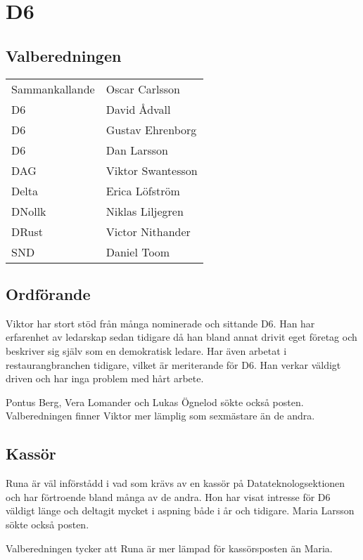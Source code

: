\section{D6}

\subsection{Valberedningen}
\begin{autoframe}

\begin{tabular}{ll}
Sammankallande & Oscar Carlsson \\
D6 & David Ådvall \\
D6 & Gustav Ehrenborg \\
D6 & Dan Larsson \\
DAG  & Viktor Swantesson \\
Delta  & Erica Löfström \\
DNollk & Niklas Liljegren \\
DRust & Victor Nithander \\
SND  & Daniel Toom
\end{tabular}

\end{autoframe}



\subsection{Ordförande}
\begin{autoframe}
Viktor har stort stöd från många nominerade och sittande D6. Han har erfarenhet av ledarskap
sedan tidigare då han bland annat drivit eget företag och beskriver sig själv som en demokratisk
ledare. Har även arbetat i restaurangbranchen tidigare, vilket är meriterande för D6.
Han verkar väldigt driven och har inga problem med hårt arbete.

\bigskip
Pontus Berg, Vera Lomander och Lukas Ögnelod sökte också posten. Valberedningen finner
Viktor mer lämplig som sexmästare än de andra.
\end{autoframe}

\subsection{Kassör}
\begin{autoframe}
Runa är väl införstådd i vad som krävs av en kassör på Datateknologsektionen och har
förtroende bland många av de andra. Hon har visat intresse för D6 väldigt länge och deltagit
mycket i aspning både i år och tidigare.
Maria Larsson sökte också posten.

\bigskip
Valberedningen tycker att Runa är mer lämpad för
kassörsposten än Maria.
\end{autoframe}


